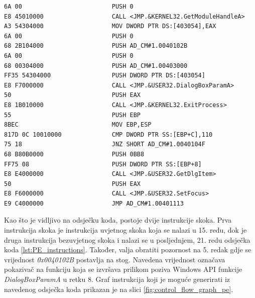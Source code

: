 \documentclass[times, utf8, diplomski, numeric]{fer}
\begin{document}
\begin{lstlisting}[frame=single, caption=Instrukcije unutar PE datoteke, label={lst:PE_instructions}]
6A 00	                      PUSH 0
E8 45010000                   CALL <JMP.&KERNEL32.GetModuleHandleA>
A3 54304000                   MOV DWORD PTR DS:[403054],EAX
6A 00                         PUSH 0                           
68 2B104000                   PUSH AD_CM#1.0040102B                    
6A 00                         PUSH 0                                    
68 00304000                   PUSH AD_CM#1.00403000                        
FF35 54304000                 PUSH DWORD PTR DS:[403054]                   
E8 F7000000                   CALL <JMP.&USER32.DialogBoxParamA>           
50                            PUSH EAX                                    
E8 1B010000                   CALL <JMP.&KERNEL32.ExitProcess>         
55                            PUSH EBP
8BEC                          MOV EBP,ESP
817D 0C 10010000              CMP DWORD PTR SS:[EBP+C],110
75 18                         JNZ SHORT AD_CM#1.0040104F
68 B80B0000                   PUSH 0BB8                                 
FF75 08                       PUSH DWORD PTR SS:[EBP+8]               
E8 E4000000                   CALL <JMP.&USER32.GetDlgItem>                 
50                            PUSH EAX                                       
E8 F6000000                   CALL <JMP.&USER32.SetFocus>                    
E9 C4000000                   JMP AD_CM#1.00401113
\end{lstlisting}
Kao što je vidljivo na odsječku koda, postoje dvije instrukcije skoka. Prva instrukcija skoka je instrukcija uvjetnog skoka koja se nalazi u 15. redu, dok je druga instrukcija bezuvjetnog skoka i nalazi se u posljednjem, 21. redu odsječka koda \ref{lst:PE_instructions}. Također, valja obratiti pozornost na 5. redak gdje se vrijednost \emph{0x0040102B} postavlja na stog. Navedena vrijednost označava pokazivač na funkciju koja se izvršava prilikom poziva Windows API funkcije \emph{DialogBoxParamA} u retku 8. Graf instrukcija koji je moguće generirati iz navedenog odsječka koda prikazan je na slici \ref{fig:control_flow_graph_pe}.
\end{document}
